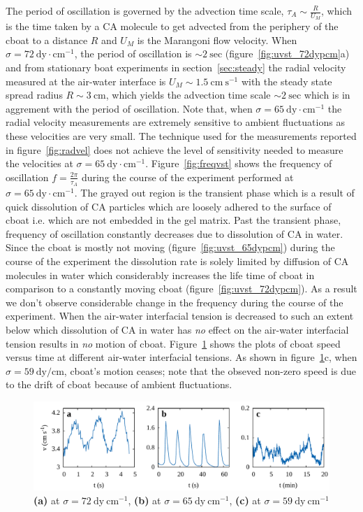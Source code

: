 \documentclass[journal=langd5, manuscript=article, layout=twocolumn]{achemso}
\begin{document}
The period of oscillation is governed by the advection time scale, $\tau_{A} \sim \frac{R}{U_{M}}$, which is the time taken by a CA molecule to get advected from the periphery of the cboat to a distance $R$ and $U_{M}$ is the Marangoni flow velocity. When $\sigma = 72\ \mathrm{dy\cdot cm^{-1}}$, the period of oscillation is $\sim 2\ \mathrm{sec}$ (figure~\ref{fig:uvst_72dypcm}a) and from stationary boat experiments in section~\ref{sec:steady} the radial velocity measured at the air-water interface is $U_{M} \sim 1.5\ \mathrm{cm\ s^{-1}}$ with the steady state spread radius $R \sim 3\ \mathrm{cm}$, which yields the advection time scale $\sim 2\ \mathrm{sec}$ which is in aggrement with the period of oscillation. Note that, when $\sigma = 65\ \mathrm{dy\cdot cm^{-1}}$ the radial velocity measurements are extremely sensitive to ambient fluctuations as these velocities are very small. The technique used for the measurements reported in figure~\ref{fig:radvel} does not achieve the level of sensitivity needed to measure the velocities at $\sigma = 65\ \mathrm{dy\cdot cm^{-1}}$. Figure~\ref{fig:freqvst} shows the frequency of oscillation $f = \frac{2\pi}{\tau_{A}}$ during the course of the experiment performed at $\sigma = 65\ \mathrm{dy\cdot cm^{-1}}$. The grayed out region is the transient phase which is a result of quick dissolution of CA particles which are loosely adhered to the surface of cboat i.e. which are not embedded in the gel matrix. Past the transient phase, frequency of oscillation constantly decreases due to dissolution of CA in water. Since the cboat is mostly not moving (figure~\ref{fig:uvst_65dypcm}) during the course of the experiment the dissolution rate is solely limited by diffusion of CA molecules in water which considerably increases the life time of cboat in comparison to a constantly moving cboat (figure~\ref{fig:uvst_72dypcm}). As a result we don't observe considerable change in the frequency during the course of the experiment. When the air-water interfacial tension is decreased to such an extent below which dissolution of CA in water has \emph{no} effect on the air-water interfacial tension results in \emph{no} motion of cboat. Figure~\ref{fig:uvst_sigma} shows the plots of cboat speed versus time at different air-water interfacial tensions. As shown in figure~\ref{fig:uvst_sigma}c, when $\sigma = 59\ \mathrm{dy/cm}$, cboat's motion ceases; note that the obseved non-zero speed is due to the drift of cboat because of ambient fluctuations.
\begin{figure}[ht]
	\centering
	\includegraphics[width=\textwidth]{uvst_sigma.pdf}
	\caption{{\bf (a)} at $\sigma = 72\ \mathrm{dy\ cm^{-1}}$, {\bf (b)} at $\sigma = 65\ \mathrm{dy\ cm^{-1}}$, {\bf (c)} at $\sigma = 59\ \mathrm{dy\ cm^{-1}}$}
\label{fig:uvst_sigma}
\end{figure}
\end{document}
